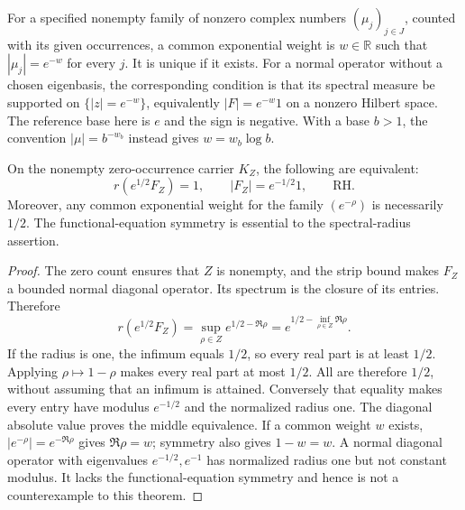\begin{definition}
\label{v4-arith:pres90:common-weight}
For a specified nonempty family of nonzero complex numbers
$(\mu_j)_{j\in J}$, counted with its given occurrences, a common
exponential weight is $w\in\mathbb R$ such that
$|\mu_j|=e^{-w}$ for every $j$. It is unique if it exists.
For a normal operator without a chosen eigenbasis, the corresponding
condition is that its spectral measure be supported on
$\{|z|=e^{-w}\}$, equivalently $|F|=e^{-w}1$ on a nonzero Hilbert space.
The reference base here is $e$ and the sign is negative.
With a base $b>1$, the convention $|\mu|=b^{-w_b}$ instead gives
$w=w_b\log b$.
\end{definition}

\begin{theorem}
\label{v4-arith:pres90:radius}
On the nonempty zero-occurrence carrier $K_Z$, the following are equivalent:
\[
 r(e^{1/2}F_Z)=1,\qquad
 |F_Z|=e^{-1/2}1,\qquad \mathrm{RH}.
\]
Moreover, any common exponential weight for the family $(e^{-\rho})$
is necessarily $1/2$. The functional-equation symmetry is essential
to the spectral-radius assertion.
\end{theorem}
\begin{proof}
The zero count ensures that $Z$ is nonempty, and the strip bound
makes $F_Z$ a bounded normal diagonal operator. Its spectrum is the
closure of its entries. Therefore
\[
 r(e^{1/2}F_Z)=\sup_{\rho\in Z}e^{1/2-\Re\rho}
             =e^{1/2-\inf_{\rho\in Z}\Re\rho}.
\]
If the radius is one, the infimum equals $1/2$, so every real part
is at least $1/2$. Applying $\rho\mapsto1-\rho$ makes every real
part at most $1/2$. All are therefore $1/2$, without assuming that
an infimum is attained. Conversely that equality makes every
entry have modulus $e^{-1/2}$ and the normalized radius one.
The diagonal absolute value proves the middle equivalence.
If a common weight $w$ exists, $|e^{-\rho}|=e^{-\Re\rho}$ gives
$\Re\rho=w$; symmetry also gives $1-w=w$.
A normal diagonal operator with eigenvalues $e^{-1/2},e^{-1}$ has
normalized radius one but not constant modulus. It lacks the
functional-equation symmetry and hence is not a counterexample to
this theorem.
\end{proof}

